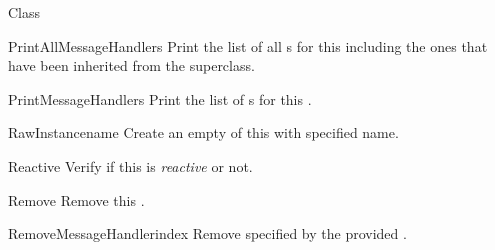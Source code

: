 \begin{classdesc*}{Class}
\begin{methoddesc}{PrintAllMessageHandlers}{}
Print the list of all s for this 
including the ones that have been inherited from the superclass.
\end{methoddesc}

\begin{methoddesc}{PrintMessageHandlers}{}
Print the list of s for this .
\end{methoddesc}

\begin{methoddesc}{RawInstance}{name}
Create an empty  of this  with specified
name.
\end{methoddesc}

\begin{memberdesc}[property]{Reactive}
Verify if this  is \emph{reactive} or not.
\end{memberdesc}

\begin{methoddesc}{Remove}{}
Remove this .
\end{methoddesc}

\begin{methoddesc}{RemoveMessageHandler}{index}
Remove  specified by the provided .
\end{methoddesc}


\end{classdesc*}
